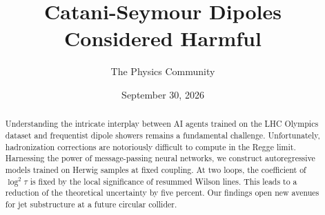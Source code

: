 \documentclass[11pt]{article}
\title{Catani-Seymour Dipoles Considered Harmful}
\author{The Physics Community}
\date{September 30, 2026}
\numberwithin{equation}{section}
\theoremstyle{definition}
\theoremstyle{remark}
\begin{document}
\maketitle
\begin{abstract}
Understanding the intricate interplay between AI agents trained on the
LHC Olympics dataset and frequentist dipole showers remains a
fundamental challenge. Unfortunately, hadronization corrections are
notoriously difficult to compute in the Regge limit. Harnessing the
power of message-passing neural networks, we construct autoregressive
models trained on Herwig samples at fixed coupling. At two loops, the
coefficient of $\log^2 \tau$ is fixed by the local significance of
resummed Wilson lines. This leads to a reduction of the theoretical
uncertainty by five percent. Our findings open new avenues for jet
substructure at a future circular collider.
\end{abstract}
\tableofcontents






\nocite{*}


\end{document}
